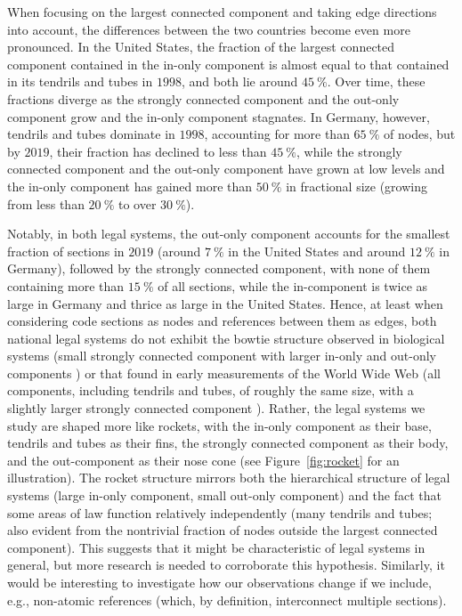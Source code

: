 \documentclass[utf8,sort&compress,table,hidelinks]{frontiersFPHY} %
\begin{document}
When focusing on the largest connected component and taking edge directions into account, the differences between the two countries become even more pronounced.  
In the United States, the fraction of the largest connected component contained in the in-only component is almost equal to that contained in its tendrils and tubes in $1998$, and both lie around $45~\%$.
Over time, these fractions diverge as the strongly connected component and the out-only component grow and the in-only component stagnates. 
In Germany, however, tendrils and tubes dominate in $1998$, accounting for more than $65~\%$ of nodes, 
but by $2019$, their fraction has declined to less than $45~\%$, while the strongly connected component and the out-only component have grown at low levels and the in-only component has gained more than $50~\%$ in fractional size (growing from less than $20~\%$ to over $30~\%$).

Notably, in both legal systems, the out-only component accounts for the smallest fraction of sections in $2019$ (around $7~\%$ in the United States and around $12~\%$ in Germany), followed by the strongly connected component, with none of them containing more than $15~\%$ of all sections, while the in-component is twice as large in Germany and thrice as large in the United States.
Hence, at least when considering code sections as nodes and references between them as edges, both national legal systems do not exhibit the bowtie structure observed in biological systems (small strongly connected component with larger in-only and out-only components \cite{friedlander2015}) or that found in early measurements of the World Wide Web (all components, including tendrils and tubes, of roughly the same size, with a slightly larger strongly connected component \cite{broder2000}).
Rather, the legal systems we study are shaped more like rockets, with the in-only component as their base, tendrils and tubes as their fins, the strongly connected component as their body, and the out-component as their nose cone (see Figure~\ref{fig:rocket} for an illustration).
The rocket structure mirrors both the hierarchical structure of legal systems (large in-only component, small out-only component) and the fact that some areas of law function relatively independently (many tendrils and tubes; also evident from the nontrivial fraction of nodes outside the largest connected component). 
This suggests that it might be characteristic of legal systems in general, but more research is needed to corroborate this hypothesis.
Similarly, it would be interesting to investigate how our observations change if we include, e.g., non-atomic references (which, by definition, interconnect multiple sections).
\end{document}
